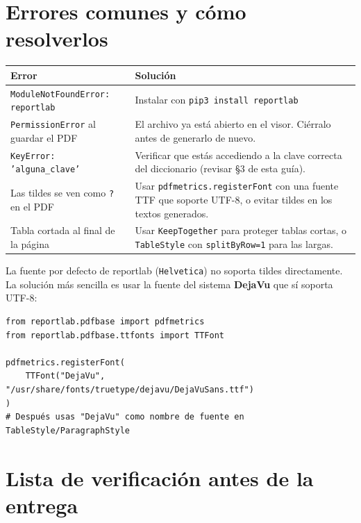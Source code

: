 \documentclass[12pt,letterpaper]{article}
\begin{document}
\section{Errores comunes y cómo resolverlos}

\begin{center}
\begin{tabularx}{\textwidth}{|p{5.5cm}|X|}
\hline
\textbf{Error} & \textbf{Solución} \\
\hline
\texttt{ModuleNotFoundError: reportlab} &
Instalar con \texttt{pip3 install reportlab} \\
\hline
\texttt{PermissionError} al guardar el PDF &
El archivo ya está abierto en el visor. Ciérralo antes de generarlo de nuevo. \\
\hline
\texttt{KeyError: 'alguna\_clave'} &
Verificar que estás accediendo a la clave correcta del diccionario (revisar
\S3 de esta guía). \\
\hline
Las tildes se ven como \texttt{?} en el PDF &
Usar \texttt{pdfmetrics.registerFont} con una fuente TTF que soporte UTF-8,
o evitar tildes en los textos generados. \\
\hline
Tabla cortada al final de la página &
Usar \texttt{KeepTogether} para proteger tablas cortas, o \texttt{TableStyle}
con \texttt{splitByRow=1} para las largas. \\
\hline
\end{tabularx}
\end{center}

\begin{tcolorbox}[tipbox={Consejo sobre tildes}]
  La fuente por defecto de reportlab (\texttt{Helvetica}) no soporta tildes
  directamente. La solución más sencilla es usar la fuente del sistema
  \textbf{DejaVu} que sí soporta UTF-8:

\begin{lstlisting}[numbers=none, aboveskip=4pt, belowskip=0pt]
from reportlab.pdfbase import pdfmetrics
from reportlab.pdfbase.ttfonts import TTFont

pdfmetrics.registerFont(
    TTFont("DejaVu", "/usr/share/fonts/truetype/dejavu/DejaVuSans.ttf")
)
# Después usas "DejaVu" como nombre de fuente en TableStyle/ParagraphStyle
\end{lstlisting}
\end{tcolorbox}

\section{Lista de verificación antes de la entrega}
\end{document}
